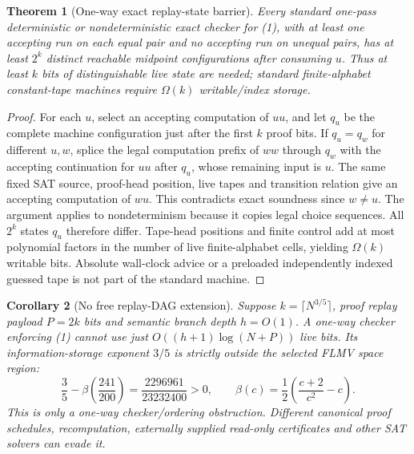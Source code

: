 \documentclass[11pt]{article}
\newtheorem{theorem}{Theorem}
\newtheorem{corollary}[theorem]{Corollary}
\begin{document}
\begin{theorem}[One-way exact replay-state barrier]\label{th:eq}
Every standard one-pass deterministic or nondeterministic exact checker for (1), with at least one accepting run on each equal pair and no accepting run on unequal pairs, has at least $2^k$ distinct reachable midpoint configurations after consuming $u$. Thus at least $k$ bits of distinguishable live state are needed; standard finite-alphabet constant-tape machines require $\Omega(k)$ writable/index storage.
\end{theorem}
\begin{proof}
For each $u$, select an accepting computation of $uu$, and let $q_u$ be the complete machine configuration just after the first $k$ proof bits. If $q_u=q_w$ for different $u,w$, splice the legal computation prefix of $ww$ through $q_w$ with the accepting continuation for $uu$ after $q_u$, whose remaining input is $u$. The same fixed SAT source, proof-head position, live tapes and transition relation give an accepting computation of $wu$. This contradicts exact soundness since $w\ne u$. The argument applies to nondeterminism because it copies legal choice sequences. All $2^k$ states $q_u$ therefore differ. Tape-head positions and finite control add at most polynomial factors in the number of live finite-alphabet cells, yielding $\Omega(k)$ writable bits. Absolute wall-clock advice or a preloaded independently indexed guessed tape is not part of the standard machine.
\end{proof}
\begin{corollary}[No free replay-DAG extension]
Suppose $k=\lceil N^{3/5}\rceil$, proof replay payload $P=2k$ bits and semantic branch depth $h=O(1)$. A one-way checker enforcing (1) cannot use just $O((h+1)\log(N+P))$ live bits. Its information-storage exponent $3/5$ is strictly outside the selected FLMV space region:
\[
 \frac35-\beta\!\left(\frac{241}{200}\right)
 =\frac{2296961}{23232400}>0,\qquad
 \beta(c)=\frac12\left(\frac{c+2}{c^2}-c\right).\tag{2}
\]
This is only a one-way checker/ordering obstruction. Different canonical proof schedules, recomputation, externally supplied read-only certificates and other SAT solvers can evade it.
\end{corollary}
\end{document}

